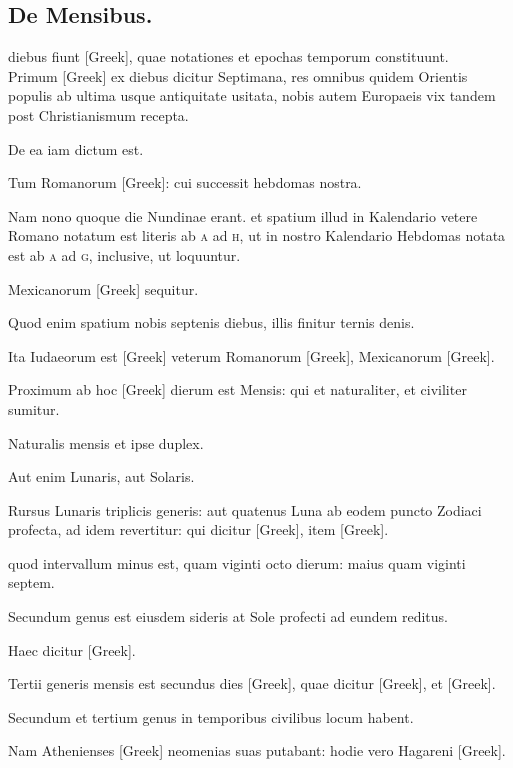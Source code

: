 \subsection{De Mensibus.}
\setcounter{parcount}{0}

 diebus fiunt \textgreek{[Greek]}, quae notationes et epochas
temporum constituunt.
\\ \p
Primum \textgreek{[Greek]} ex diebus dicitur Septimana,
res omnibus quidem Orientis populis ab ultima usque
antiquitate usitata,
 nobis autem Europaeis vix tandem post Christianismum
recepta.

De ea iam dictum est.

Tum Romanorum \textgreek{[Greek]}: cui
successit hebdomas nostra.

Nam nono quoque die Nundinae erant.
et spatium illud in Kalendario vetere Romano notatum est literis ab
\textsc{a} ad \textsc{h}, ut in nostro Kalendario Hebdomas
 notata est ab \textsc{a} ad \textsc{g}, inclusive,
ut loquuntur.

Mexicanorum \textgreek{[Greek]} sequitur.

Quod
enim spatium nobis septenis diebus, illis finitur ternis denis.

Ita Iudaeorum
est \textgreek{[Greek]} veterum Romanorum \textgreek{[Greek]}, Mexicanorum
\textgreek{[Greek]}.

Proximum ab hoc \textgreek{[Greek]} dierum est Mensis:
qui et naturaliter, et civiliter sumitur.

Naturalis mensis et ipse duplex.

Aut enim Lunaris, aut Solaris.

Rursus Lunaris triplicis generis:
aut quatenus Luna ab eodem puncto Zodiaci profecta, ad idem
revertitur: qui dicitur \textgreek{[Greek]}, item \textgreek{[Greek]}.

quod intervallum
minus est, quam viginti octo dierum: maius quam viginti septem.

Secundum genus est eiusdem sideris at Sole profecti ad eundem
reditus.

Haec dicitur \textgreek{[Greek]}.

Tertii generis mensis est secundus
dies \textgreek{[Greek]}, quae dicitur \textgreek{[Greek]},
 et \textgreek{[Greek]}.

Secundum et tertium genus in temporibus civilibus locum habent.

Nam Athenienses \textgreek{[Greek]} neomenias suas putabant: hodie vero
Hagareni \textgreek{[Greek]}.


